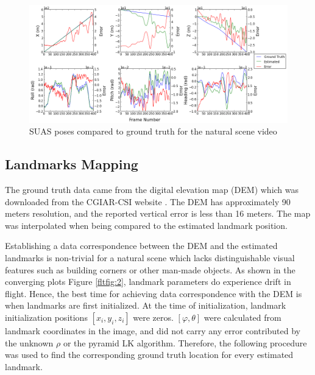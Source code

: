 \begin{figure}[h]
\centering
\includegraphics[width=15.5cm, keepaspectratio=true]
{./Figures/fltfig/cut1/Figure30.png}
\caption{SUAS poses compared to ground truth for the natural scene video}
\label{fltfig:6}
\end{figure}
\FloatBarrier

\subsection{Landmarks Mapping}\label{sec:accuracy_features}

The ground truth data came from the digital elevation map (DEM) which
was downloaded from the CGIAR-CSI website \cite{_cgiar-csi_????}. The
DEM has approximately 90 meters resolution, and the reported vertical
error is less than 16 meters. The map was interpolated when being
compared to the estimated landmark position. 

Establishing a data correspondence between the DEM and the estimated
landmarks is non-trivial for a natural scene which lacks
distinguishable visual features such as building corners or other
man-made objects. As shown in the converging plots Figure
\ref{fltfig:2}, landmark parameters do experience drift in flight.
Hence, the best time for achieving data correspondence with the DEM is
when landmarks are first initialized. At the time of initialization,
landmark initialization positions $[x_i, y_i, z_i]$ were zeros.
$[\varphi, \theta]$ were calculated from landmark coordinates in the
image, and did not carry any error contributed by the unknown $\rho$
or the pyramid LK algorithm. Therefore, the following procedure was
used to find the corresponding ground truth location for every
estimated landmark.

